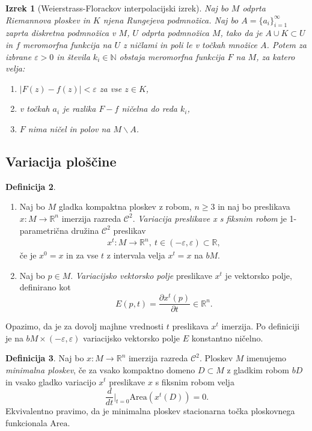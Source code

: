 \documentclass[12pt,a4paper,twoside]{article}
\theoremstyle{definition} %
\newtheorem{definicija}{Definicija}[section]
\theoremstyle{plain} %
\newtheorem{izrek}[definicija]{Izrek}
\numberwithin{equation}{section}  %
\newcommand{\R}{\mathbb R}
\newcommand{\N}{\mathbb N}
\begin{document}
\begin{izrek} [Weierstrass-Florackov interpolacijski izrek]
Naj bo $M$ odprta Riemannova ploskev in $K$ njena Rungejeva podmnožica. Naj bo $A = \{ a_i \}_{i=1}^{\infty}$ zaprta diskretna podmnožica v $M$, $U$ odprta podmnožica $M$, tako da je $A \cup K \subset U$ in $f$ meromorfna funkcija na $U$ z ničlami in poli le v točkah množice $A$.
Potem za izbrane $\varepsilon > 0$ in števila $k_{i} \in \N$ obstaja meromorfna funkcija $F$ na $M$, za katero velja:
\begin{enumerate}
\item $|F(z) - f(z)| < \varepsilon$ za vse $z \in K$,
\item v točkah $a_i$ je razlika $F-f$ ničelna do reda $k_i$,
\item $F$ nima ničel in polov na $M \backslash A$.
\end{enumerate} 
\end{izrek}

\subsection{Variacija ploščine}
\begin{definicija}
\begin{enumerate}
\item
Naj bo $M$ gladka kompaktna ploskev z robom, $n \geq 3$ in naj bo preslikava $x \colon M \to \R^{n}$ imerzija razreda $\mathcal{C}^2$. \emph{Variacija preslikave x s fiksnim robom} je 1-parametrična družina $\mathcal{C}^2$ preslikav 
\begin{gather}
x^{t} \colon M \to \R^{n},\ t \in (-\varepsilon, \varepsilon) \subset \R,
\end{gather}
če je $x^0 = x$ in za vse $t$ z intervala velja $x^{t} = x$ na $bM$.
%
\item
Naj bo $p \in M$. \emph{Variacijsko vektorsko polje} preslikave $x^{t}$ je vektorsko polje, definirano kot
\begin{equation}
E(p,t) = \frac{\partial{x^t(p)}}{\partial{t}} \in \R^{n}.
\end{equation}
\end{enumerate}
\end{definicija}

Opazimo, da je za dovolj majhne vrednosti $t$ preslikava $x^{t}$ imerzija.
Po definiciji je na $bM \times (-\varepsilon, \varepsilon)$ variacijsko vektorsko polje $E$ konstantno ničelno.

\begin{definicija}
Naj bo $x \colon M \to \R^{n}$ imerzija razreda $\mathcal{C}^2$. Ploskev $M$ imenujemo \emph{minimalna ploskev}, če za vsako kompaktno domeno $D \subset M$ z gladkim robom $bD$ in vsako gladko variacijo $x^{t}$ preslikave $x$ s fiksnim robom velja
\begin{equation} \label{eq:1-var-ploščine}
\frac{d}{dt} \Big|_{t=0} \text{Area}(x^{t}(D)) = 0.
\end{equation}
Ekvivalentno pravimo, da je minimalna ploskev stacionarna točka ploskovnega funkcionala $\text{Area}$.
\end{definicija}
\end{document}
